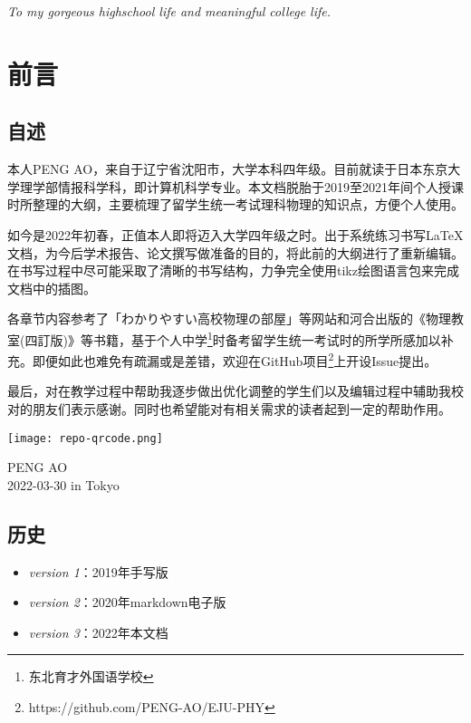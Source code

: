 
\clearpage
\begin{center}
    \null

    \vspace{0.382\textheight}
    \textit{\large
        To my gorgeous highschool life
        and meaningful college life.
    }
\end{center}


\clearpage
\chapter{前言}

\section*{自述}
本人PENG AO，来自于辽宁省沈阳市，大学本科四年级。目前就读于日本东京大学理学部情报科学科，即计算机科学专业。本文档脱胎于2019至2021年间个人授课时所整理的大纲，主要梳理了留学生统一考试理科物理的知识点，方便个人使用。

如今是2022年初春，正值本人即将迈入大学四年级之时。出于系统练习书写\LaTeX 文档，为今后学术报告、论文撰写做准备的目的，将此前的大纲进行了重新编辑。在书写过程中尽可能采取了清晰的书写结构，力争完全使用tikz绘图语言包来完成文档中的插图。

各章节内容参考了「わかりやすい高校物理の部屋」等网站和河合出版的《物理教室(四訂版)》等书籍，基于个人中学\footnote{东北育才外国语学校}时备考留学生统一考试时的所学所感加以补充。即便如此也难免有疏漏或是差错，欢迎在GitHub项目\footnote{https://github.com/PENG-AO/EJU-PHY}上开设Issue提出。

最后，对在教学过程中帮助我逐步做出优化调整的学生们以及编辑过程中辅助我校对的朋友们表示感谢。同时也希望能对有相关需求的读者起到一定的帮助作用。

\begin{center}
    \texttt{[image: repo-qrcode.png]}
\end{center}

\begin{flushright}
    PENG AO\\
    2022-03-30 in Tokyo
\end{flushright}

\section*{历史}
\begin{itemize}
    \item \textit{version 1}：2019年手写版
    \item \textit{version 2}：2020年markdown电子版
    \item \textit{version 3}：2022年本文档
\end{itemize}

